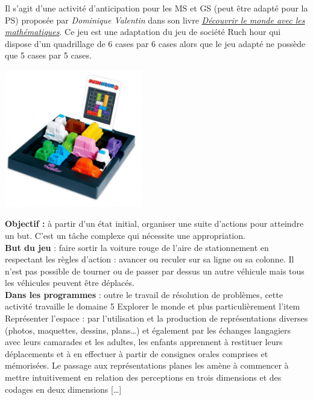 \begin{exercice*} %
\begin{minipage}{8cm}
   Il s'agit d'une activité d'anticipation pour les MS et GS (peut être adapté pour la PS) proposée par {\it Dominique Valentin} dans son livre \href{http://www.editions-hatier.fr/livre/decouvrir-les-mathematiques-grande-section-ed-2015-guide-de-lenseignant}{\it\blue Découvrir le monde avec les mathématiques}. Ce jeu est une adaptation du jeu de société \og Ruch hour \fg{} qui dispose d'un quadrillage de 6 cases par 6 cases alors que le jeu adapté ne possède que 5 cases par 5 cases.
\end{minipage}
\hspace*{1cm}
\begin{minipage}{6cm}
   \includegraphics[width=6cm]{Nombres_et_calculs_did/Images/Num2_activites_Rush_hour}
\end{minipage}

{\bf Objectif :} à partir d’un état initial, organiser une suite d’actions pour atteindre un but. C'est un tâche complexe qui nécessite une appropriation. \\

{\bf But du jeu} : faire sortir la voiture rouge de l'aire de stationnement en respectant les règles d'action : avancer ou reculer sur sa ligne ou sa colonne. Il n'est pas possible de tourner ou de passer par dessus un autre véhicule mais tous les véhicules peuvent être déplacés. \\

{\bf Dans les programmes} : outre le travail de résolution de problèmes, cette activité travaille le domaine 5 \og Explorer le monde \fg{} et plus particulièrement l'item \og Représenter l’espace \fg : par l’utilisation et la production de représentations diverses (photos, maquettes, dessins, plans\dots) et également par les échanges langagiers avec leurs camarades et les adultes, les enfants apprennent à restituer leurs déplacements et à en effectuer à partir de consignes orales comprises et mémorisées. Le passage aux représentations planes les amène à commencer à mettre intuitivement en relation des perceptions en trois dimensions et des codages en deux dimensions [\dots] \\


\end{exercice*}
